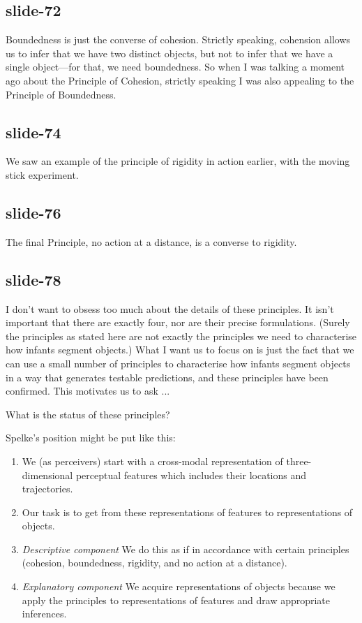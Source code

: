 \documentclass[12pt,\papersize]{extarticle}
\begin{document}
\subsection{slide-72}
Boundedness is just the converse of cohesion.
Strictly speaking, cohension allows us to infer that we have two 
distinct objects, but not to infer that we have a single object---for that, we need boundedness.
So when I was talking a moment ago about the Principle of Cohesion, strictly speaking I was 
also appealing to the Principle of Boundedness.
 
\subsection{slide-74}
We saw an example of the principle of rigidity in action earlier, with the moving stick 
experiment.
 
\subsection{slide-76}
The final Principle, no action at a distance, is a converse to rigidity.
 
\subsection{slide-78}
I don't want to obsess too much about the details of these principles.  
It isn't important that there are exactly four, nor are their precise formulations.
(Surely the principles as stated here are not exactly the principles we need to characterise
how infants segment objects.)
What I want us to focus on is just the fact that we can use a small number of principles to 
characterise how infants segment objects in a way that generates testable predictions,
and these principles have been confirmed.
This motivates us to ask ...
 
What is the status of these principles?
 
Spelke’s position might be put like this:
 
\begin{enumerate}

\item We (as perceivers) start with a cross-modal representation of three-dimensional 
perceptual features which includes their locations and trajectories.

\item Our task is to get from these representations of features to representations of objects.

\item \emph{Descriptive component} We do this as if in accordance with certain principles 
(cohesion, boundedness, rigidity, and no action at a distance).

\item \emph{Explanatory component}  We acquire representations of objects because we apply the 
principles to representations of features and draw appropriate inferences.

\end{enumerate}
 
\end{document}
